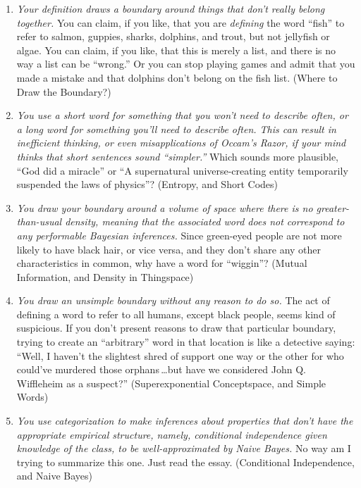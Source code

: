 {\begin{enumerate}
\item {
 \textit{Your definition draws a boundary around things that
don't really belong together.} You can claim, if you
like, that you are \textit{defining} the word
``fish'' to refer to salmon,
guppies, sharks, dolphins, and trout, but not jellyfish or algae. You
can claim, if you like, that this is merely a list, and there is no way
a list can be ``wrong.'' Or you can
stop playing games and admit that you made a mistake and that dolphins
don't belong on the fish list. (Where to Draw the
Boundary?)}

\item {
 \textit{You use a short word for something that you
won't need to describe often, or a long word for
something you'll need to describe often. This can
result in inefficient thinking, or even misapplications of
Occam's Razor, if your mind thinks that short sentences
sound ``simpler.''} Which sounds
more plausible, ``God did a
miracle'' or ``A supernatural
universe-creating entity temporarily suspended the laws of
physics''? (Entropy, and Short Codes)}

\item {
 \textit{You draw your boundary around a volume of space where
there is no greater-than-usual density, meaning that the associated
word does not correspond to any performable Bayesian inferences.} Since
green-eyed people are not more likely to have black hair, or vice
versa, and they don't share any other characteristics
in common, why have a word for
``wiggin''? (Mutual Information, and
Density in Thingspace)}

\item {
 \textit{You draw an unsimple boundary without any reason to do
so.} The act of defining a word to refer to all humans, except black
people, seems kind of suspicious. If you don't present
reasons to draw that particular boundary, trying to create an
``arbitrary'' word in that location
is like a detective saying: ``Well, I
haven't the slightest shred of support one way or the
other for who could've murdered those orphans\,\ldots but
have we considered John Q. Wiffleheim as a suspect?''
(Superexponential Conceptspace, and Simple Words)}

\item {
 \textit{You use categorization to make inferences about properties
that don't have the appropriate empirical structure,
namely, conditional independence given knowledge of the class, to be
well-approximated by Naive Bayes.} No way am I trying to summarize this
one. Just read the essay. (Conditional Independence, and Naive Bayes)}


\end{enumerate}}
